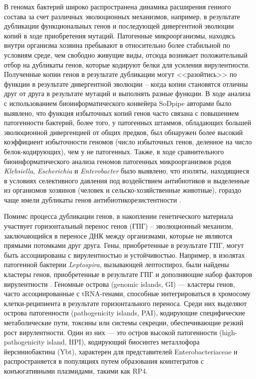 \documentclass[14pt]{extreport}
\begin{document}
В геномах бактерий широко распространена динамика расширения генного состава за счет различных эволюционных механизмов, например, в результате дубликации функциональных генов и последующей дивергентной эволюции копий в ходе приобретения мутаций. Патогенные микроорганизмы, находясь внутри организма хозяина пребывают в относительно более стабильной по условиям среде, чем свободно живущие виды, отсюда возникает положительный отбор на дубликаты генов, которые кодируют белки для усиления вирулентности. Полученные копии генов в результате дубликации могут <<разойтись>> по функции в результате дивергентной эволюции -- когда копии становятся отличны друг от друга в результате мутаций и выполнять разные функции. В ходе анализа с использованием биоинформатического конвейера SoDpipe \cite{wang2025deciphering} авторами было выявлено, что функция избыточных копий генов часто связана с повышением патогенности бактерий, более того, у патогенных штаммов, обладающих большей эволюционной дивергенцией от общих предков, был обнаружен более высокий коэффициент избыточности геномов (число избыточных генов, деленное на число белок-кодирующих), чем у не патогенных. Также, в ходе сравнительного биоинформатического анализа геномов патогенных микроорганизмов родов \textit{Klebsiella}, \textit{Escherichia} и \textit{Enterobacter} было выявлено, что изоляты, находящиеся в условиях селективного давления под воздействием антибиотиков и выделенные из организмов хозяинов (человек и сельско-хозяйственные животные), гораздо чаще имели дубликаты генов антибиотикорезистентности \cite{maddamsetti2024duplicated}.

Помимс процесса дубликации генов, в накоплении генетического материала участвует горизонтальный перенос генов (ГПГ) -- эволюционный механизм, заключающийся в переносе ДНК между организмами, которые не являются прямыми потомками друг друга. Гены, приобретенные в результате ГПГ, могут быть ассоциированы с вирулентностью и устойчивостью. Например, в изолятах патогенной бактерии \textit{Leptospira}, вызывающей лептоспироз, были найдены кластеры генов, приобретенные в результате ГПГ и дополняющие набор факторов вирулентности \cite{xu2016whole}. Геномные острова (genomic islands, GI) — кластеры генов, часто ассоциированные с tRNA-генами, способные интегрироваться в хромосому клетки-реципиента в результате горизонтального переноса. Среди них выделяют острова патогенности (pathogenicity islands, PAI), кодирующие специфические метаболические пути, токсины или системы секреции, обеспечивающие резкий рост вирулентности. Один из них — это остров высокой патогенности (high-pathogenicity island, HPI), кодирующий биосинтез металлофора йерсиниобактина (Ybt), характерен для представителей Enterobacteriaceae \cite{rakin2017ostrov} и распространяется в популяциях путем образования коинтегратов с конъюгативными плазмидами, такими как RP4.
\end{document}
